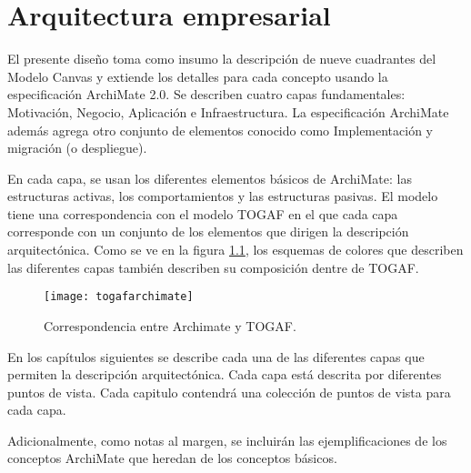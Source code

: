 
\chapter{Arquitectura empresarial}

El presente diseño toma como insumo la descripción de nueve cuadrantes del Modelo Canvas y extiende los detalles para cada concepto usando la especificación ArchiMate 2.0. Se describen cuatro capas fundamentales: Motivación, Negocio, Aplicación e Infraestructura. La especificación ArchiMate además agrega otro conjunto de elementos conocido como Implementación y migración (o despliegue). 

En cada capa, se usan los diferentes elementos básicos de ArchiMate: las estructuras activas, los comportamientos y las estructuras pasivas. El modelo tiene una correspondencia con el modelo TOGAF \cite{josey2011togaf} en el que cada capa corresponde con un conjunto de los elementos que dirigen la descripción arquitectónica. Como se ve en la figura \ref{togafarchimate}, los esquemas de colores que describen las diferentes capas también describen su composición dentre de TOGAF.

\begin{figure}[h]\label{togafarchimate}
\centering
\texttt{[image: togafarchimate]}
\caption{Correspondencia entre Archimate y TOGAF.}
\end{figure}

En los capítulos siguientes se describe cada una de las diferentes capas que permiten la descripción arquitectónica. Cada capa está descrita por diferentes puntos de vista. Cada capitulo contendrá una colección de puntos de vista para cada capa.

Adicionalmente, como notas al margen, se incluirán las ejemplificaciones de los conceptos ArchiMate que heredan de los conceptos básicos. 